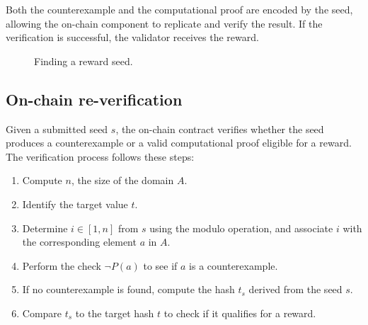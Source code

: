 \documentclass[runningheads]{llncs}
\begin{document}
Both the counterexample and the computational proof are encoded by the seed, allowing the on-chain component to replicate and verify the result. If the verification is successful, the validator receives the reward.
\begin{figure}[t]
    \centering
{}
\caption{Finding a reward seed.}
\label{fig:find_seed}
\end{figure}
\subsection{On-chain re-verification}
Given a submitted seed \( s \), the on-chain contract verifies whether the seed produces a counterexample or a valid computational proof eligible for a reward. The verification process follows these steps:
\begin{enumerate}
    \item Compute \( n \), the size of the domain \( A \).
    \item Identify the target value \( t \).
    \item Determine \( i \in [1, n] \) from \( s \) using the modulo operation, and associate \( i \) with the corresponding element \( a \) in \( A \).
    \item Perform the check \( \neg P(a) \) to see if \( a \) is a counterexample.
    \item If no counterexample is found, compute the hash \( t_s \) derived from the seed \( s \).
    \item Compare \( t_s \) to the target hash \( t \) to check if it qualifies for a reward.
\end{enumerate}
\end{document}
